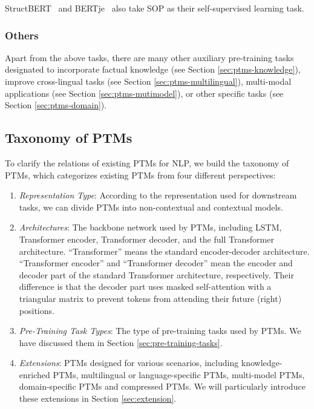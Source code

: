 \documentclass[fleqn]{SCYE-arxiv}
\begin{document}
\begin{multicols}{2}
StructBERT~\cite{wang2020structbert} and BERTje~\cite{vries2019bertje} also take SOP as their self-supervised learning task.

\subsubsection{Others}

Apart from the above tasks, there are many other auxiliary pre-training tasks designated  to incorporate factual knowledge  (see Section \ref{sec:ptms-knowledge}), improve cross-lingual tasks (see Section \ref{sec:ptms-multilingual}), multi-modal applications (see Section \ref{sec:ptms-mutimodel}), or other specific tasks (see Section \ref{sec:ptms-domain}).







\subsection{Taxonomy of PTMs}
\label{sec:taxonomy}



To clarify the relations of existing PTMs for NLP, we build the taxonomy of PTMs, which categorizes existing PTMs from four different perspectives:
\begin{enumerate}
  \item \textit{Representation Type}: According to the representation used for downstream tasks, we can divide PTMs into non-contextual and contextual models.
  \item \textit{Architectures}: The backbone network used by PTMs, including LSTM, Transformer encoder, Transformer decoder, and the full Transformer architecture. ``Transformer'' means the standard encoder-decoder architecture. ``Transformer encoder'' and ``Transformer decoder'' mean the encoder and decoder part of the standard Transformer architecture, respectively. Their difference is that the decoder part uses masked self-attention with a triangular matrix to prevent tokens from attending their future (right) positions.
  \item \textit{Pre-Training Task Types}: The type of pre-training tasks used by PTMs. We have discussed them in Section \ref{sec:pre-training-tasks}.
  \item \textit{Extensions}: PTMs designed for various scenarios, including knowledge-enriched PTMs, multilingual or language-specific PTMs, multi-model PTMs, domain-specific PTMs and compressed PTMs.
      We will particularly introduce these extensions in Section \ref{sec:extension}.
\end{enumerate}



\end{multicols}
\end{document}
